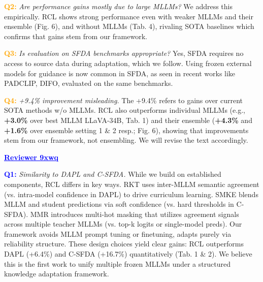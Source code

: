 \documentclass[10pt,twocolumn,letterpaper]{article}
\begin{document}
\textcolor{orange}{\textbf{Q2:}} \textit{Are performance gains mostly due to large MLLMs?}
We address this empirically. RCL shows strong performance even with weaker MLLMs and their ensemble (Fig. 6), and without MLLMs (Tab. 4), rivaling SOTA baselines which confirms that gains stem from our framework.

\textcolor{orange}{\textbf{Q3:}} \textit{Is evaluation on SFDA benchmarks appropriate?}
Yes, SFDA requires no access to source data during adaptation, which we follow. Using frozen external models for guidance is now common in SFDA, as seen in recent works like PADCLIP, DIFO, evaluated on the same benchmarks.

\textcolor{orange}{\textbf{Q4:}} \textit{+9.4\% improvement misleading.} 
The +9.4\% refers to gains over current SOTA methods w/o MLLMs. RCL also outperforms individual MLLMs (e.g., \textbf{+3.0\%} over best MLLM LLaVA-34B, Tab. 1) and their ensemble (\textbf{+4.3\% }and \textbf{+1.6\%} over ensemble setting 1 \& 2 resp.; Fig. 6), showing that improvements stem from our framework, not ensembling.
We will revise the text accordingly.

 
\noindent \textbf{\textcolor{blue}{\underline{Reviewer 9xwq}}}

\textcolor{blue}{\textbf{Q1:}} \textit{Similarity to DAPL and C-SFDA.}
While we build on established components, RCL differs in key ways. RKT uses inter-MLLM semantic agreement (vs. intra-model confidence in DAPL) to drive curriculum learning. SMKE blends MLLM and student predictions via soft confidence (vs. hard thresholds in C-SFDA). MMR introduces multi-hot masking that utilizes agreement signals across multiple teacher MLLMs (vs. top-k logits or single-model preds). Our framework avoids MLLM prompt tuning or finetuning, adapts purely via reliability structure. These design choices yield clear gains: RCL outperforms DAPL (+6.4\%) and C-SFDA (+16.7\%) quantitatively (Tab. 1 \& 2). We believe this is the first work to unify multiple frozen MLLMs under a structured knowledge adaptation framework. 
\end{document}
